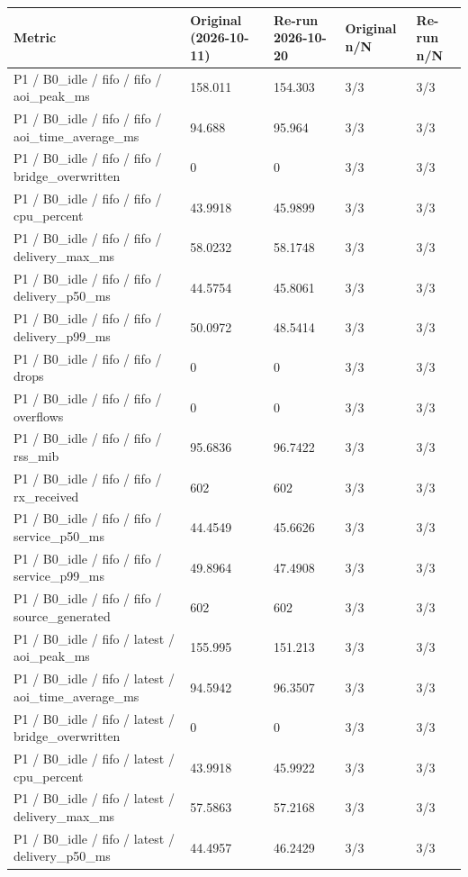 \begin{tabular}{@{}lllll@{}}
\toprule
Metric & Original (2026-10-11) & Re-run 2026-10-20 & Original n/N & Re-run n/N \\
\midrule
P1 / B0\_idle / fifo / fifo / aoi\_peak\_ms & 158.011 & 154.303 & 3/3 & 3/3 \\
P1 / B0\_idle / fifo / fifo / aoi\_time\_average\_ms & 94.688 & 95.964 & 3/3 & 3/3 \\
P1 / B0\_idle / fifo / fifo / bridge\_overwritten & 0 & 0 & 3/3 & 3/3 \\
P1 / B0\_idle / fifo / fifo / cpu\_percent & 43.9918 & 45.9899 & 3/3 & 3/3 \\
P1 / B0\_idle / fifo / fifo / delivery\_max\_ms & 58.0232 & 58.1748 & 3/3 & 3/3 \\
P1 / B0\_idle / fifo / fifo / delivery\_p50\_ms & 44.5754 & 45.8061 & 3/3 & 3/3 \\
P1 / B0\_idle / fifo / fifo / delivery\_p99\_ms & 50.0972 & 48.5414 & 3/3 & 3/3 \\
P1 / B0\_idle / fifo / fifo / drops & 0 & 0 & 3/3 & 3/3 \\
P1 / B0\_idle / fifo / fifo / overflows & 0 & 0 & 3/3 & 3/3 \\
P1 / B0\_idle / fifo / fifo / rss\_mib & 95.6836 & 96.7422 & 3/3 & 3/3 \\
P1 / B0\_idle / fifo / fifo / rx\_received & 602 & 602 & 3/3 & 3/3 \\
P1 / B0\_idle / fifo / fifo / service\_p50\_ms & 44.4549 & 45.6626 & 3/3 & 3/3 \\
P1 / B0\_idle / fifo / fifo / service\_p99\_ms & 49.8964 & 47.4908 & 3/3 & 3/3 \\
P1 / B0\_idle / fifo / fifo / source\_generated & 602 & 602 & 3/3 & 3/3 \\
P1 / B0\_idle / fifo / latest / aoi\_peak\_ms & 155.995 & 151.213 & 3/3 & 3/3 \\
P1 / B0\_idle / fifo / latest / aoi\_time\_average\_ms & 94.5942 & 96.3507 & 3/3 & 3/3 \\
P1 / B0\_idle / fifo / latest / bridge\_overwritten & 0 & 0 & 3/3 & 3/3 \\
P1 / B0\_idle / fifo / latest / cpu\_percent & 43.9918 & 45.9922 & 3/3 & 3/3 \\
P1 / B0\_idle / fifo / latest / delivery\_max\_ms & 57.5863 & 57.2168 & 3/3 & 3/3 \\
P1 / B0\_idle / fifo / latest / delivery\_p50\_ms & 44.4957 & 46.2429 & 3/3 & 3/3 \\

\end{tabular}
